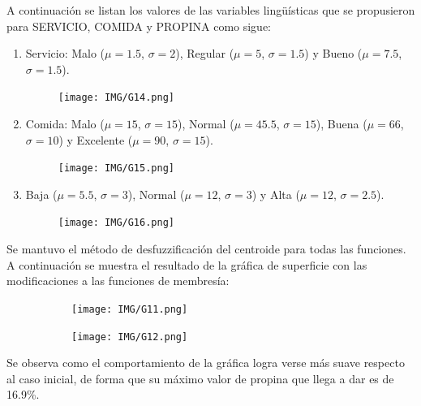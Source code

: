 \documentclass[11pt, letterpaper]{article}
\begin{document}
A continuación se listan los valores de las variables lingüísticas que se propusieron para SERVICIO, COMIDA y PROPINA como sigue:


\begin{enumerate}
	\item Servicio: Malo ($\mu = 1.5$, $\sigma = 2$), Regular ($\mu = 5$, $\sigma = 1.5$) y Bueno ($\mu = 7.5$, $\sigma = 1.5$).
	\begin{figure}[h]
		\centering
		\texttt{[image: IMG/G14.png]}
	\end{figure}
	
	\item Comida: Malo ($\mu = 15$, $\sigma = 15$), Normal ($\mu = 45.5$, $\sigma = 15$), Buena ($\mu = 66$, $\sigma = 10$) y Excelente ($\mu = 90$, $\sigma = 15$).
	\begin{figure}[h]
		\centering
		\texttt{[image: IMG/G15.png]}
	\end{figure}
	\newpage
	\item Baja ($\mu = 5.5$, $\sigma = 3$), Normal ($\mu = 12$, $\sigma = 3$) y Alta ($\mu = 12$, $\sigma = 2.5$).
	\begin{figure}[h]
		\centering
		\texttt{[image: IMG/G16.png]}
	\end{figure}
\end{enumerate}

Se mantuvo el método de desfuzzificación del centroide para todas las funciones.\\

A continuación se muestra el resultado de la gráfica de superficie con las modificaciones a las funciones de membresía: \\


\begin{figure}[h]
	\centering
	\begin{subfigure}{0.42\textwidth} %
		\centering
		\texttt{[image: IMG/G11.png]}
		\label{fig:G11}
	\end{subfigure}
	\hfill
	\begin{subfigure}{0.42\textwidth} %
		\centering
		\texttt{[image: IMG/G12.png]}
		\label{fig:G12}
	\end{subfigure}
	\label{fig:comparacion}
\end{figure}

Se observa como el comportamiento de la gráfica logra verse más suave respecto al caso inicial, de forma que su máximo valor de propina que llega a dar es de 16.9\%.

\newpage
\end{document}
